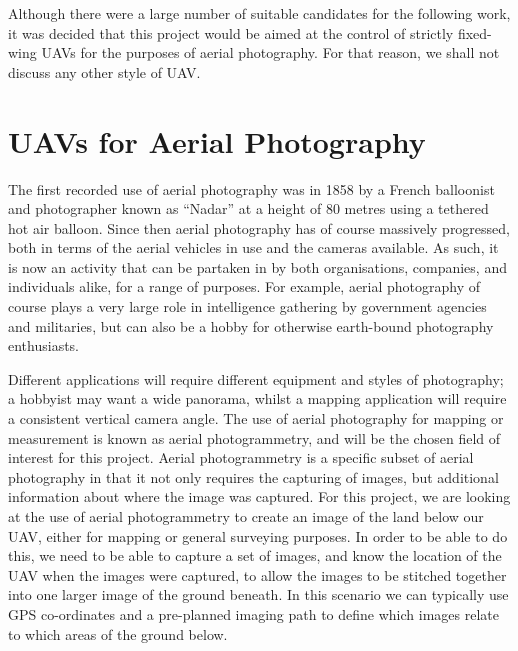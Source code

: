 Although there were a large number of suitable candidates for the following work, it was decided that this project would be aimed at the control of strictly fixed-wing UAVs for the purposes of aerial photography. For that reason, we shall not discuss any other style of UAV. %

\section{UAVs for Aerial Photography} 
\label{intro:photography}

The first recorded use of aerial photography was in 1858 by a French balloonist and photographer known as ``Nadar'' at a height of 80 metres using a tethered hot air balloon. %
Since then aerial photography has of course massively progressed, both in terms of the aerial vehicles in use and the cameras available. As such, it is now an activity that can be partaken in by both organisations, companies, and individuals alike, for a range of purposes. For example, aerial photography of course plays a very large role in intelligence gathering by government agencies and militaries, but can also be a hobby for otherwise earth-bound photography enthusiasts. 

Different applications will require different equipment and styles of photography; a hobbyist may want a wide panorama, whilst a mapping application will require a consistent vertical camera angle. The use of aerial photography for mapping or measurement is known as aerial photogrammetry, and will be the chosen field of interest for this project. Aerial photogrammetry is a specific subset of aerial photography in that it not only requires the capturing of images, but additional information about where the image was captured. For this project, we are looking at the use of aerial photogrammetry to create an image of the land below our UAV, either for mapping or general surveying purposes. In order to be able to do this, we need to be able to capture a set of images, and know the location of the UAV when the images were captured, to allow the images to be stitched together into one larger image of the ground beneath. In this scenario we can typically use GPS co-ordinates and a pre-planned imaging path to define which images relate to which areas of the ground below. %


